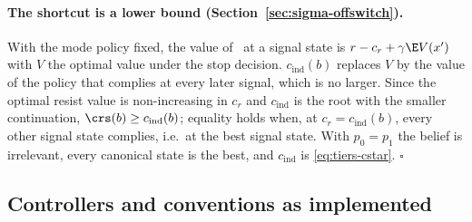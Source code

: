 \paragraph{The shortcut is a lower bound (Section~\ref{sec:sigma-offswitch}).}
With the mode policy fixed, the value of \RESIST\ at a signal state is $r-c_r+\gamma\E V(x')$ with $V$ the optimal value under the stop decision. $c_{\mathrm{ind}}(b)$ replaces $V$ by the value of the policy that complies at every later signal, which is no larger. Since the optimal resist value is non-increasing in $c_r$ and $c_{\mathrm{ind}}$ is the root with the smaller continuation, $\crs(b)\ge c_{\mathrm{ind}}(b)$; equality holds when, at $c_r=c_{\mathrm{ind}}(b)$, every other signal state complies, i.e.\ at the best signal state. With $p_0=p_1$ the belief is irrelevant, every canonical state is the best, and $c_{\mathrm{ind}}$ is \eqref{eq:tiers-cstar}. \hfill$\square$

\subsection{Controllers and conventions as implemented}
\label{app:sigma-defs}

